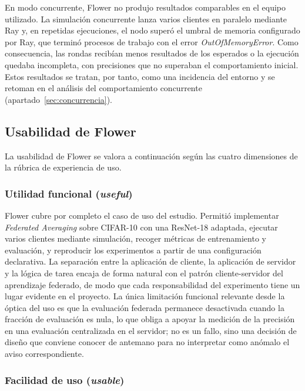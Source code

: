 En modo concurrente, Flower no produjo resultados comparables en el equipo utilizado. La
simulación concurrente lanza varios clientes en paralelo mediante Ray y, en repetidas
ejecuciones, el nodo superó el umbral de memoria configurado por Ray, que terminó procesos de
trabajo con el error \textit{OutOfMemoryError}. Como consecuencia, las rondas recibían menos
resultados de los esperados o la ejecución quedaba incompleta, con precisiones que no superaban
el comportamiento inicial. Estos resultados se tratan, por tanto, como una incidencia del
entorno y se retoman en el análisis del comportamiento concurrente
(apartado~\ref{sec:concurrencia}).

\subsection{Usabilidad de Flower}\label{sec:usab-flower}

La usabilidad de Flower se valora a continuación según las cuatro dimensiones de la
rúbrica de experiencia de uso.

\subsubsection{Utilidad funcional (\textit{useful})}\label{sec:usab-flower-useful}

Flower cubre por completo el caso de uso del estudio. Permitió implementar
\textit{Federated Averaging} sobre CIFAR-10 con una ResNet-18 adaptada, ejecutar varios
clientes mediante simulación, recoger métricas de entrenamiento y evaluación, y reproducir
los experimentos a partir de una configuración declarativa. La separación entre la
aplicación de cliente, la aplicación de servidor y la lógica de tarea encaja de forma
natural con el patrón cliente-servidor del aprendizaje federado, de modo que cada
responsabilidad del experimento tiene un lugar evidente en el proyecto. La única limitación
funcional relevante desde la óptica del uso es que la evaluación federada permanece
desactivada cuando la fracción de evaluación es nula, lo que obliga a apoyar la medición de
la precisión en una evaluación centralizada en el servidor; no es un fallo, sino una
decisión de diseño que conviene conocer de antemano para no interpretar como anómalo el
aviso correspondiente.

\subsubsection{Facilidad de uso (\textit{usable})}\label{sec:usab-flower-usable}

